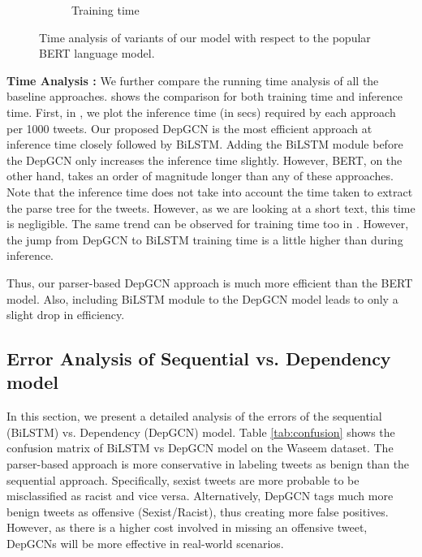 \begin{figure}[tbh]
\begin{subfigure}{0.45\textwidth}
    \caption{Training time}
    \label{fig:train}
    \end{subfigure}
    \caption{\label{fig:time} Time analysis of variants of our model with respect to the popular BERT \cite{devlin2019bert} language model. }
\end{figure}

\noindent
\textbf{Time Analysis :} We further compare the running time analysis of all the baseline approaches.  shows the comparison for both training time and inference time. First, in , we plot the inference time (in secs) required by each approach per 1000 tweets. Our proposed DepGCN is the most efficient approach at inference time closely followed by BiLSTM. Adding the BiLSTM module before the DepGCN only increases the inference time slightly. However, BERT, on the other hand, takes an order of magnitude longer than any of these approaches. Note that the inference time does not take into account the time taken to extract the parse tree for the tweets. However, as we are looking at a short text, this time is negligible.
The same trend can be observed for training time too in . However, the jump from DepGCN to BiLSTM training time is a little higher than during inference.

Thus, our parser-based DepGCN approach is much more efficient than the BERT model. Also, including BiLSTM module to the DepGCN model leads to only a slight drop in efficiency.


\subsection{Error Analysis of Sequential vs. Dependency model}
\label{sec:error}
In this section, we present a detailed analysis of the errors of the sequential (BiLSTM) vs. Dependency (DepGCN) model. Table \ref{tab:confusion} shows the confusion matrix of BiLSTM vs DepGCN model on the Waseem dataset. The parser-based approach is more conservative in labeling tweets as benign than the sequential approach. Specifically, sexist tweets are more probable to be misclassified as racist and vice versa.
Alternatively, DepGCN tags much more benign tweets as offensive (Sexist/Racist), thus creating more false positives. However, as there is a higher cost involved in missing an offensive tweet, DepGCNs will be more effective in real-world scenarios.


